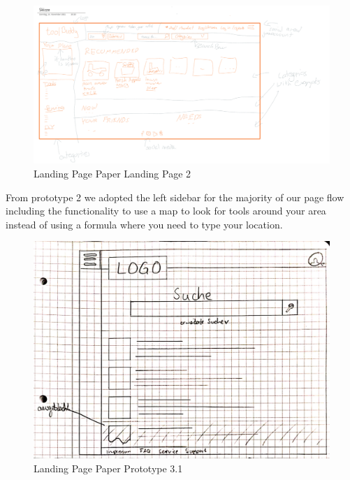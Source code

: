 			
			 \begin{figure}[H]
				\centering
				\includegraphics[width=\linewidth]{abb/6_Sketching and Paper Prototyping/Homepage2.png}
				\caption{Landing Page Paper Landing Page 2}
				\label{fig:Homepage2}
			\end{figure}
			
			\noindent
			From prototype 2 we adopted the left sidebar for the majority of our page flow including the functionality to use a map to look for tools around your area instead of using a formula where you need to type your location.
			
			\begin{figure}[H]
				\centering
				\includegraphics[width=\linewidth]{abb/6_Sketching and Paper Prototyping/Homepage3.png}
				\caption{Landing Page Paper Prototype 3.1}
				\label{fig:Homepage3}
			\end{figure}
			
